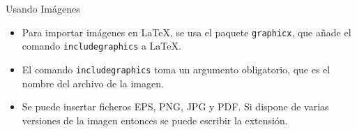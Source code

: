 \documentclass[12pt]{beamer}
\begin{document}
\begin{frame}{Usando Im\'agenes}
  \begin{itemize}
    \item Para importar im\'agenes en \LaTeX, se usa el paquete \texttt{\color{blue}graphicx},
     que añade el comando \texttt{\color{blue}includegraphics} a \LaTeX{}.
    \item<2-> El comando \texttt{\color{blue}includegraphics} toma un argumento obligatorio, que es el nombre del archivo de la imagen.
    \item<3-> Se puede insertar ficheros EPS, PNG, JPG y PDF. Si dispone de varias versiones de la imagen entonces se puede escribir la extensión.
  \end{itemize}
\end{frame}
\end{document}
